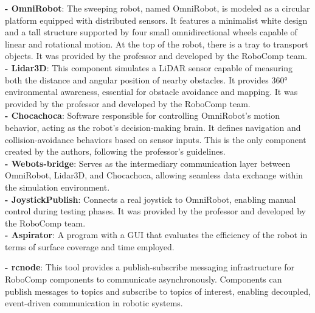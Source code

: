 \documentclass[conference]{IEEEtran}
\begin{document}
\begin{itemize}
    \textbf{- OmniRobot}: The sweeping robot, named OmniRobot, is modeled as a circular platform equipped with distributed sensors. It features a minimalist white design and a tall structure supported by four small omnidirectional wheels capable of linear and rotational motion. At the top of the robot, there is a tray to transport objects. It was provided by the professor and developed by the RoboComp team. \\
    \textbf{- Lidar3D}: This component simulates a LiDAR sensor capable of measuring both the distance and angular position of nearby obstacles. It provides 360° environmental awareness, essential for obstacle avoidance and mapping. It was provided by the professor and developed by the RoboComp team. \\
    \textbf{- Chocachoca}: Software responsible for controlling OmniRobot’s motion behavior, acting as the robot’s decision-making brain. It defines navigation and collision-avoidance behaviors based on sensor inputs. This is the only component created by the authors, following the professor’s guidelines. \\
    \textbf{- Webots-bridge}: Serves as the intermediary communication layer between OmniRobot, Lidar3D, and Chocachoca, allowing seamless data exchange within the simulation environment. \\
    \textbf{- JoystickPublish}: Connects a real joystick to OmniRobot, enabling manual control during testing phases. It was provided by the professor and developed by the RoboComp team. \\
    \textbf{- Aspirator}: A program with a GUI that evaluates the efficiency of the robot in terms of surface coverage and time employed.

    \textbf{- rcnode}: This tool provides a publish-subscribe messaging infrastructure for RoboComp components to communicate asynchronously. Components can publish messages to topics and subscribe to topics of interest, enabling decoupled, event-driven communication in robotic systems.  



\end{itemize}
\end{document}
